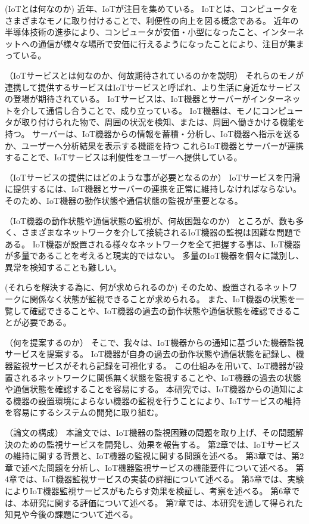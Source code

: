 
(IoTとは何なのか)
近年、IoTが注目を集めている。
IoTとは、コンピュータをさまざまなモノに取り付けることで、利便性の向上を図る概念である。
近年の半導体技術の進歩により、コンピュータが安価・小型になったこと、インターネットへの通信が様々な場所で安価に行えるようになったことにより、注目が集まっている。


（IoTサービスとは何なのか、何故期待されているのかを説明）
それらのモノが連携して提供するサービスはIoTサービスと呼ばれ、より生活に身近なサービスの登場が期待されている。
IoTサービスは、IoT機器とサーバーがインターネットを介して通信し合うことで、成り立っている。
IoT機器は、モノにコンピュータが取り付けられた物で、周囲の状況を検知、または、周囲へ働きかける機能を持つ。
サーバーは、IoT機器からの情報を蓄積・分析し、IoT機器へ指示を送るか、ユーザーへ分析結果を表示する機能を持つ
これらIoT機器とサーバーが連携することで、IoTサービスは利便性をユーザーへ提供している。


（IoTサービスの提供にはどのような事が必要となるのか）
IoTサービスを円滑に提供するには、IoT機器とサーバーの連携を正常に維持しなければならない。
そのため、IoT機器の動作状態や通信状態の監視が重要となる。


（IoT機器の動作状態や通信状態の監視が、何故困難なのか）
ところが、数も多く、さまざまなネットワークを介して接続されるIoT機器の監視は困難な問題である。
IoT機器が設置される様々なネットワークを全て把握する事は、IoT機器が多量であることを考えると現実的ではない。
多量のIoT機器を個々に識別し、異常を検知することも難しい。


(それらを解決する為に、何が求められるのか)
そのため、設置されるネットワークに関係なく状態が監視できることが求められる。
また、IoT機器の状態を一覧して確認できることや、IoT機器の過去の動作状態や通信状態を確認できることが必要である。

（何を提案するのか）
そこで、我々は、IoT機器からの通知に基づいた機器監視サービスを提案する。
IoT機器が自身の過去の動作状態や通信状態を記録し、機器監視サービスがそれら記録を可視化する。
この仕組みを用いて、IoT機器が設置されるネットワークに関係無く状態を監視することや、IoT機器の過去の状態や通信状態を確認することを容易にする。
本研究では、IoT機器からの通知による機器の設置環境によらない機器の監視を行うことにより、IoTサービスの維持を容易にするシステムの開発に取り組む。


（論文の構成）
本論文では、IoT機器の監視困難の問題を取り上げ、その問題解決のための監視サービスを開発し、効果を報告する。
第2章では、IoTサービスの維持に関する背景と、IoT機器の監視に関する問題を述べる。
第3章では、第2章で述べた問題を分析し、IoT機器監視サービスの機能要件について述べる。
第4章では、IoT機器監視サービスの実装の詳細について述べる。
第5章では、実験によりIoT機器監視サービスがもたらす効果を検証し、考察を述べる。
第6章では、本研究に関する評価について述べる。
第7章では、本研究を通して得られた知見や今後の課題について述べる。


